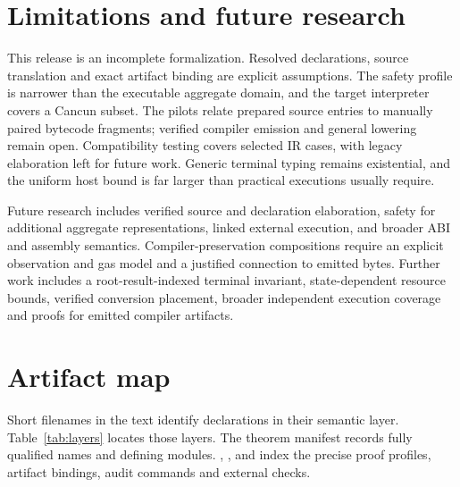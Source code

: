 \documentclass[conference]{IEEEtran}
\begin{document}
\section{Limitations and future research}
This release is an incomplete formalization. Resolved declarations, source
translation and exact artifact binding are explicit assumptions. The safety
profile is narrower than the executable aggregate domain, and the target
interpreter covers a Cancun subset. The pilots relate prepared source entries
to manually paired bytecode fragments; verified compiler emission and general
lowering remain open. Compatibility testing covers selected IR cases, with
legacy elaboration left for future work. Generic terminal typing remains
existential, and the uniform host bound is far larger than practical executions
usually require.

Future research includes verified source and declaration elaboration, safety
for additional aggregate representations, linked external execution, and
broader ABI and assembly semantics. Compiler-preservation compositions require
an explicit observation and gas model and a justified connection to emitted
bytes. Further work includes a root-result-indexed terminal invariant,
state-dependent resource bounds, verified conversion placement, broader
independent execution coverage and proofs for emitted compiler artifacts.

\appendices
\section{Artifact map}
Short filenames in the text identify declarations in their semantic
layer. Table~\ref{tab:layers} locates those layers. The theorem manifest records
fully qualified names and defining modules. , ,
 and  index the precise proof profiles,
artifact bindings, audit commands and external checks.
\end{document}
